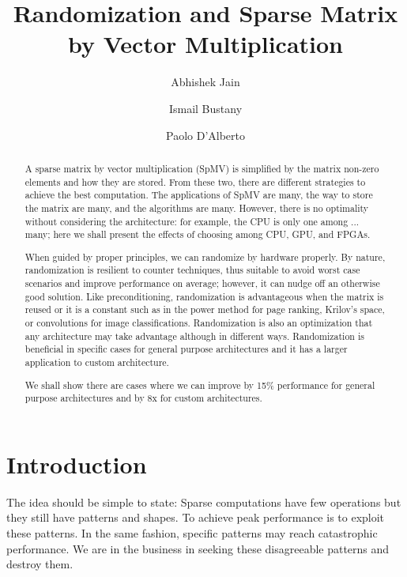 \documentclass[manuscript,screen]{acmart}
\begin{document}
\title{Randomization and Sparse Matrix by Vector Multiplication }

\author{Abhishek Jain}
\author{Ismail Bustany}
\author{Paolo D'Alberto}


\renewcommand{\shortauthors}{Jain et al.}

\begin{abstract}
A sparse matrix by vector multiplication (SpMV) is simplified by the
matrix non-zero elements and how they are stored. From these two,
there are different strategies to achieve the best computation. The
applications of SpMV are many, the way to store the matrix are many,
and the algorithms are many. However, there is no optimality without
considering the architecture: for example, the CPU is only one among
... many; here we shall present the effects of choosing among CPU,
GPU, and FPGAs.

When guided by proper principles, we can randomize by hardware
properly. By nature, randomization is resilient to counter techniques,
thus suitable to avoid worst case scenarios and improve performance on
average; however, it can nudge off an otherwise good solution. Like
preconditioning, randomization is advantageous when the matrix is
reused or it is a constant such as in the power method for page
ranking, Krilov's space, or convolutions for image classifications.
Randomization is also an optimization that any architecture may take
advantage although in different ways. Randomization is beneficial in
specific cases for general purpose architectures and it has a larger
application to custom architecture.

We shall show there are cases where we can improve by 15\% performance
for general purpose architectures and by 8x for custom architectures.

\end{abstract}

\maketitle

\section{Introduction}
The idea should be simple to state: Sparse computations have few
operations but they still have patterns and shapes. To achieve peak
performance is to exploit these patterns. In the same fashion,
specific patterns may reach catastrophic performance.  We are in the
business in seeking these disagreeable patterns and destroy them.
\end{document}
